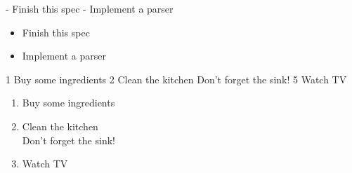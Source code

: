 \begin{examples}
\begin{examplesource}
- Finish this spec
- Implement a parser
\end{examplesource}
  \begin{exampleoutput}
    \begin{minipage}{0.5\textwidth}
      \begin{itemize}[noitemsep]
      \item Finish this spec
      \item Implement a parser
      \end{itemize}
    \end{minipage}
  \end{exampleoutput}
\begin{examplesource}
1 Buy some ingredients
2 Clean the kitchen
  Don't forget the sink!
5 Watch TV
\end{examplesource}
  \begin{exampleoutput}
    \begin{minipage}{0.5\textwidth}
      \begin{enumerate}[noitemsep]
      \item Buy some ingredients
      \item Clean the kitchen\\Don't forget the sink!
        \setcounter{enumi}{4}
      \item Watch TV
      \end{enumerate}
    \end{minipage}
  \end{exampleoutput}
\end{examples}

